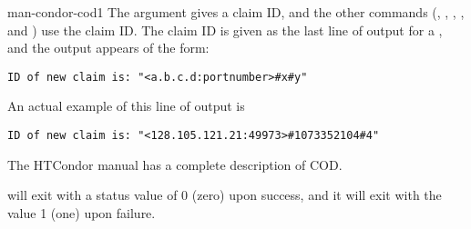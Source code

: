 \begin{ManPage}{}{man-condor-cod}{1}
The  argument gives a claim ID, and the other 
commands (, , , ,
and ) use the claim ID.
The claim ID is given as the last line of output for a ,
and the output appears of the form:
\footnotesize
\begin{verbatim}
ID of new claim is: "<a.b.c.d:portnumber>#x#y"
\end{verbatim}
\normalsize
An actual example of this line of output is 
\footnotesize
\begin{verbatim}
ID of new claim is: "<128.105.121.21:49973>#1073352104#4"
\end{verbatim}
\normalsize

The HTCondor manual has a complete description of COD.

\begin{Options}
  \ToolArgsBaseDesc
  \ToolLocateDesc
\end{Options}

\GenRem

\Examples

\ExitStatus

 will exit with a status value of 0 (zero) upon success,
and it will exit with the value 1 (one) upon failure.

\end{ManPage}
